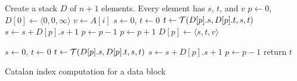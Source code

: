 \begin{algorithm}[H]
\SetAlgoNoLine
\LinesNumbered
{}
Create a stack $D$ of $n+1$ elements.  Every element has $s$, $t$, and $v$ \;
$p \gets 0$, $D[0] \gets \langle 0,0,\infty \rangle$ \;
 {
  $v \gets A[i]$ \; $s \gets 0$, $t \gets 0$ \;
   {
    $t \gets {\cal T}(D[p].s, D[p].t, s, t)$ \;
    $s \gets s + D[p].s + 1$ \;
    $p \gets p - 1$ \;
  }
  $p \gets p + 1$ \;
  $D[p] \gets \langle s,t,{v}\rangle$ \;
}

$s \gets 0$, $t \gets 0$ \;
 {
  $t \gets {\cal T}(D[p].s, D[p].t, s, t)$ \;
  $s \gets s + D[p].s + 1$ \;
  $p \gets p - 1$ \;
}
return $t$ \;

\caption{Catalan index computation for a data block}
\label{alg:cartesian-encode-offline}
\end{algorithm}
